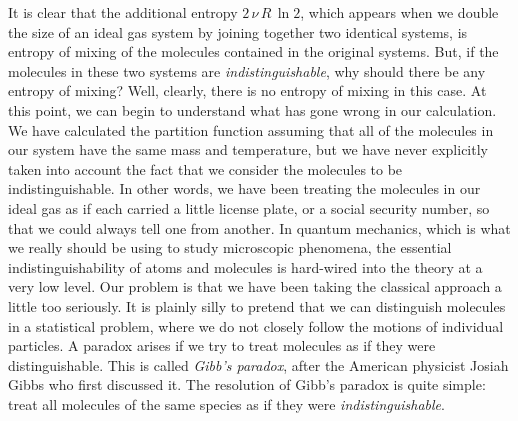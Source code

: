 	It is clear that the additional entropy $2\,\nu \,R \,\ln 2$,
which appears when we
double the size of an ideal gas
 system by joining together two identical systems,
is entropy of mixing of the molecules contained in the  original systems.
 But, if the 
molecules in these two systems are {\em indistinguishable}, why should there be any
entropy of mixing? Well, clearly, there is no entropy of mixing in this case. 
At this point, we can begin to understand what has gone wrong in our calculation.
We have calculated the partition function assuming
that all of the molecules in our system have the
same mass and temperature, but we have never explicitly taken into account
the fact that we consider the molecules to be indistinguishable.
In other words, we have been treating the molecules in our ideal gas as if each
carried a little license plate, or a social security number, so that we could always
tell one from another.  In quantum mechanics,
which is what we really should be using to study microscopic phenomena, the
essential indistinguishability of atoms and molecules is hard-wired into the
theory at a very low level. Our problem is that we have been taking the classical
approach a little too seriously. It is plainly silly to pretend that we can 
distinguish molecules in a statistical problem, where we do not closely
follow the motions
of individual particles. A paradox arises if we try to treat molecules
as if they were distinguishable. This is called {\em Gibb's paradox}, after 
the American physicist Josiah Gibbs who first discussed it. The resolution
of Gibb's paradox is quite simple: treat all molecules of the same species
as if they were {\em indistinguishable}.

